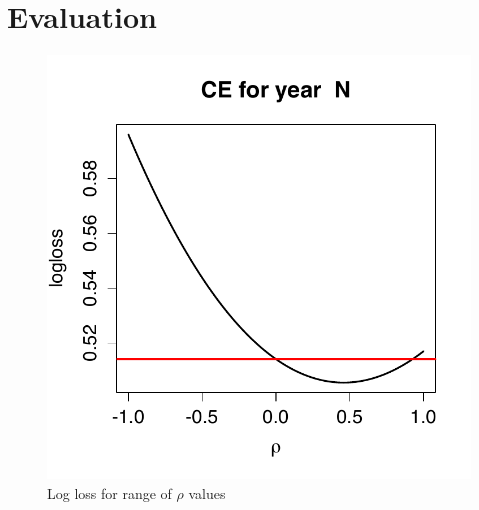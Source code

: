 \section{Evaluation}
\begin{figure}[h]
\includegraphics[width=1\textwidth]{Sample_ME.pdf}
\caption{Log loss for range of $\rho$ values}
\end{figure}
